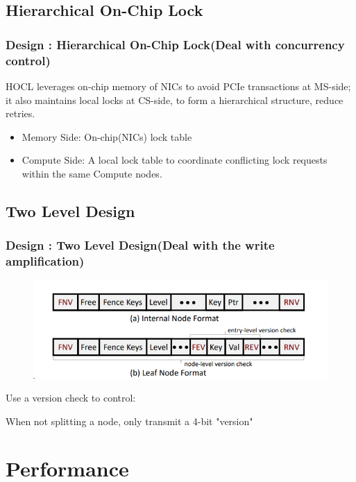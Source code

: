 \documentclass[11pt]{beamer}                                                                                                   %
\begin{document}
\subsection{Hierarchical On-Chip Lock}
\begin{frame}[t]
	\frametitle{Design : Hierarchical On-Chip Lock(Deal with concurrency control)}
	HOCL leverages on-chip memory of
	NICs to avoid PCIe transactions at MS-side; it also maintains local
	locks at CS-side, to form a hierarchical structure, reduce retries.
	\begin{itemize}
		\item Memory Side: On-chip(NICs) lock table
		\item Compute Side: A local lock table to coordinate conflicting lock requests within the same Compute nodes.
	\end{itemize}  
\end{frame}

\subsection{Two Level Design}

\begin{frame}[t]

	\frametitle{Design : Two Level Design(Deal with the write amplification)}
	\begin{figure}
		\centering
		\includegraphics[width=0.7\linewidth]{16}
	\end{figure}
\centering
	Use a version check to control:
	
	
	When not splitting a node, only transmit a 4-bit "version"
\end{frame}
\section{Performance}
\end{document}
